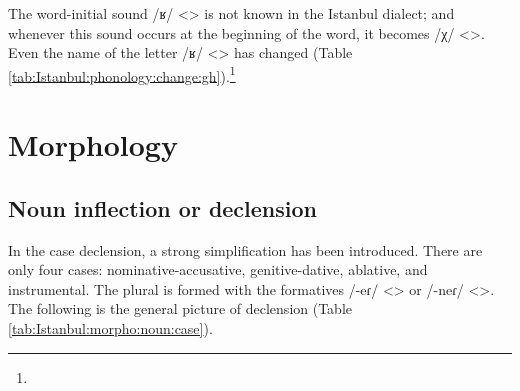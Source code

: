 The word-initial sound /ʁ/ <> is not known in the Istanbul dialect; and whenever this sound occurs at the beginning of the word, it becomes /χ/ <>. Even the name of the letter /ʁ/ <> has changed (Table \ref{tab:Istanbul:phonology:change:gh}).\footnote{} 


\begin{table}[H]
	\centering 
	\caption{Absence of word-initial Classical Armenian /ʁ/ <> in the Istanbul dialect}
	\label{tab:Istanbul:phonology:change:gh}
\end{table}



\section{Morphology}
\subsection{Noun inflection or declension}\label{sec:Istanbul:morpho:noun}
In the case declension, a strong simplification has been introduced. There are only four cases: nominative-accusative, genitive-dative, ablative, and instrumental. The plural is formed with the formatives /-eɾ/ <> or /-neɾ/ <>. The following is the general picture of declension (Table \ref{tab:Istanbul:morpho:noun:case}). 



